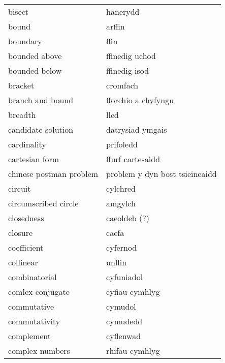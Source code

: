 \begin{supertabular}{p{0.22\textwidth}p{0.22\textwidth}}
                           bisect &                         hanerydd \\
                            bound &                           arffin \\
                         boundary &                             ffin \\
                    bounded above &                   ffinedig uchod \\
                    bounded below &                    ffinedig isod \\
                          bracket &                         cromfach \\
                 branch and bound &              fforchio a chyfyngu \\
                          breadth &                             lled \\
               candidate solution &                 datrysiad ymgais \\
                      cardinality &                        prifoledd \\
                   cartesian form &                 ffurf cartesaidd \\
          chinese postman problem &   problem y dyn bost tsieineaidd \\
                          circuit &                         cylchred \\
             circumscribed circle &                          amgylch \\
                       closedness &                     caeoldeb (?) \\
                          closure &                            caefa \\
                      coefficient &                         cyfernod \\
                        collinear &                           unllin \\
                    combinatorial &                       cyfuniadol \\
                 comlex conjugate &                   cyfiau cymhlyg \\
                      commutative &                          cymudol \\
                    commutativity &                         cymudedd \\
                       complement &                        cyflenwad \\
                  complex numbers &                   rhifau cymhlyg \\

\end{supertabular}
